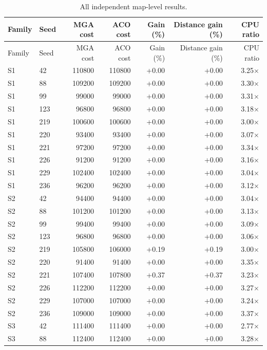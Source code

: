 \begin{longtable}{llrrrrr}
\caption{All independent map-level results.}\label{tab:all-maps}\\
\toprule
Family & Seed & MGA cost & ACO cost & Gain (\%) & Distance gain (\%) & CPU ratio \\
\midrule
\endfirsthead
\toprule
Family & Seed & MGA cost & ACO cost & Gain (\%) & Distance gain (\%) & CPU ratio \\
\midrule
\endhead
S1 & 42 & 110800 & 110800 & +0.00 & +0.00 & 3.25$\times$ \\
S1 & 88 & 109200 & 109200 & +0.00 & +0.00 & 3.30$\times$ \\
S1 & 99 & 99000 & 99000 & +0.00 & +0.00 & 3.31$\times$ \\
S1 & 123 & 96800 & 96800 & +0.00 & +0.00 & 3.18$\times$ \\
S1 & 219 & 100600 & 100600 & +0.00 & +0.00 & 3.00$\times$ \\
S1 & 220 & 93400 & 93400 & +0.00 & +0.00 & 3.07$\times$ \\
S1 & 221 & 97200 & 97200 & +0.00 & +0.00 & 3.34$\times$ \\
S1 & 226 & 91200 & 91200 & +0.00 & +0.00 & 3.16$\times$ \\
S1 & 229 & 102400 & 102400 & +0.00 & +0.00 & 3.04$\times$ \\
S1 & 236 & 96200 & 96200 & +0.00 & +0.00 & 3.12$\times$ \\
S2 & 42 & 94400 & 94400 & +0.00 & +0.00 & 3.04$\times$ \\
S2 & 88 & 101200 & 101200 & +0.00 & +0.00 & 3.13$\times$ \\
S2 & 99 & 99400 & 99400 & +0.00 & +0.00 & 3.09$\times$ \\
S2 & 123 & 96800 & 96800 & +0.00 & +0.00 & 3.06$\times$ \\
S2 & 219 & 105800 & 106000 & +0.19 & +0.19 & 3.00$\times$ \\
S2 & 220 & 91400 & 91400 & +0.00 & +0.00 & 3.35$\times$ \\
S2 & 221 & 107400 & 107800 & +0.37 & +0.37 & 3.23$\times$ \\
S2 & 226 & 112200 & 112200 & +0.00 & +0.00 & 3.27$\times$ \\
S2 & 229 & 107000 & 107000 & +0.00 & +0.00 & 3.24$\times$ \\
S2 & 236 & 109000 & 109000 & +0.00 & +0.00 & 3.37$\times$ \\
S3 & 42 & 111400 & 111400 & +0.00 & +0.00 & 2.77$\times$ \\
S3 & 88 & 112400 & 112400 & +0.00 & +0.00 & 3.28$\times$ \\

\end{longtable}
